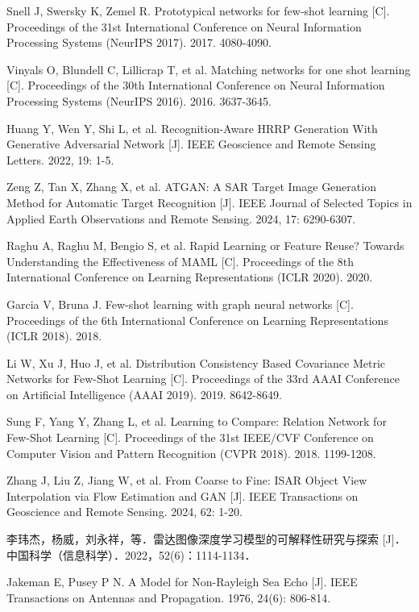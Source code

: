\documentclass[doctor,twoside,ttf]{nudtpaper}
\begin{document}
\begin{thebibliography}{99}
 Snell J, Swersky K, Zemel R. Prototypical networks for few-shot learning [C]. Proceedings of the 31st International Conference on Neural Information Processing Systems (NeurIPS 2017). 2017. 4080-4090.

 Vinyals O, Blundell C, Lillicrap T, et al. Matching networks for one shot learning [C]. Proceedings of the 30th International Conference on Neural Information Processing Systems (NeurIPS 2016). 2016. 3637-3645.

 Huang Y, Wen Y, Shi L, et al. Recognition-Aware HRRP Generation With Generative Adversarial Network [J]. IEEE Geoscience and Remote Sensing Letters. 2022, 19: 1-5.

 Zeng Z, Tan X, Zhang X, et al. ATGAN: A SAR Target Image Generation Method for Automatic Target Recognition [J]. IEEE Journal of Selected Topics in Applied Earth Observations and Remote Sensing. 2024, 17: 6290-6307.

 Raghu A, Raghu M, Bengio S, et al. Rapid Learning or Feature Reuse? Towards Understanding the Effectiveness of MAML [C]. Proceedings of the 8th International Conference on Learning Representations (ICLR 2020). 2020.

 Garcia V, Bruna J. Few-shot learning with graph neural networks [C]. Proceedings of the 6th International Conference on Learning Representations (ICLR 2018). 2018.

 Li W, Xu J, Huo J, et al. Distribution Consistency Based Covariance Metric Networks for Few-Shot Learning [C]. Proceedings of the 33rd AAAI Conference on Artificial Intelligence (AAAI 2019). 2019. 8642-8649.

 Sung F, Yang Y, Zhang L, et al. Learning to Compare: Relation Network for Few-Shot Learning [C]. Proceedings of the 31st IEEE/CVF Conference on Computer Vision and Pattern Recognition (CVPR 2018). 2018. 1199-1208.

 Zhang J, Liu Z, Jiang W, et al. From Coarse to Fine: ISAR Object View Interpolation via Flow Estimation and GAN [J]. IEEE Transactions on Geoscience and Remote Sensing. 2024, 62: 1-20.

 李玮杰，杨威，刘永祥，等．雷达图像深度学习模型的可解释性研究与探索 [J]．中国科学（信息科学）．2022，52(6)：1114-1134．

 Jakeman E, Pusey P N. A Model for Non-Rayleigh Sea Echo [J]. IEEE Transactions on Antennas and Propagation. 1976, 24(6): 806-814.


\end{thebibliography}
\end{document}
